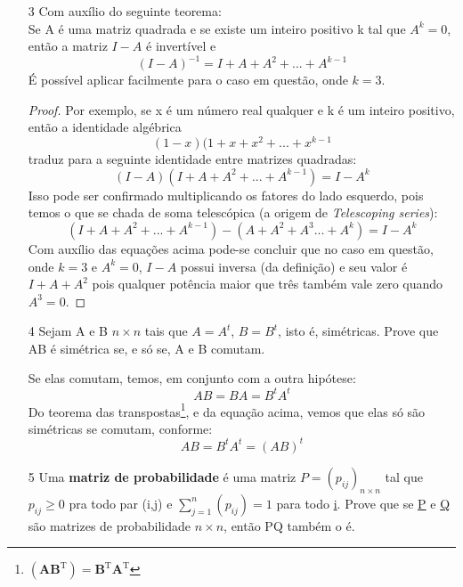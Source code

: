 \documentclass[11pt]{article}
\begin{document}
\begin{itemize}
\item[3] Com auxílio do seguinte teorema:
\\ Se A é uma matriz quadrada e se existe um inteiro positivo k tal que $A^k=0$, então a matriz $I-A$ é invertível e $$(I-A)^{-1} = I + A + A^2 + ... + A^{k-1}$$
É possível aplicar facilmente para o caso em questão, onde $k=3$.
\begin{proof}
Por exemplo, se x é um número real qualquer e k é um inteiro positivo, então a identidade algébrica $$(1-x)(1+x+x^2+...+x^{k-1}$$ traduz para a seguinte identidade entre matrizes quadradas:
$$
(I-A)(I+A+A^2+...+A^{k-1})=I-A^k
$$
Isso pode ser confirmado multiplicando os fatores do lado esquerdo, pois temos o que se chada de soma telescópica (a origem de \textit{Telescoping series}):
$$
(I+A+A^2+...+A^{k-1}) - (A+A^2+A^3...+A^k) = I-A^k
$$
Com auxílio das equações acima pode-se concluir que no caso em questão, onde $k=3$ e $A^k=0$,      $I-A$ possui inversa (da definição) e seu valor é $I + A + A^2$ pois qualquer potência maior que três também vale zero quando $A^3=0$.\qedhere
\end{proof}


\item[4] Sejam A e B $n\times n$ tais que $A=A^t$, $B=B^t$, isto é, simétricas. Prove que AB é simétrica se, e só se, A e B comutam.

Se elas comutam, temos, em conjunto com a outra hipótese:
$$AB=BA=B^tA^t$$
Do teorema das transpostas\footnote{$(\mathbf{A B}^\mathrm{T}) = \mathbf{B}^\mathrm{T} \mathbf{A}^\mathrm{T}$}, e da equação acima, vemos que elas só são simétricas se comutam, conforme:
$$AB=B^tA^t=(AB)^t$$

\item[5] Uma \textbf{matriz de probabilidade} é uma matriz $P=(p_{ij})_{n \times n}$ tal que $p_{ij} \geq 0$ pra todo par (i,j) e $\sum_{j=1}^{n}(p_{ij})=1$ para todo \underline{i}. Prove que se \underline{P} e \underline{Q} são matrizes de probabilidade $n \times n$, então PQ também o é.


\end{itemize}
\end{document}
